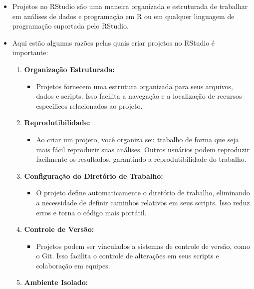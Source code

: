 \documentclass[
  letterpaper,
  DIV=11,
  numbers=noendperiod]{scrartcl}
\providecommand{\tightlist}{%
  \setlength{\itemsep}{0pt}\setlength{\parskip}{0pt}}\usepackage{longtable,booktabs,array}
\begin{document}
\begin{itemize}
\item
  Projetos no RStudio são uma maneira organizada e estruturada de
  trabalhar em análises de dados e programação em R ou em qualquer
  linguagem de programação suportada pelo RStudio.
\item
  Aqui estão algumas razões pelas quais criar projetos no RStudio é
  importante:

  \begin{enumerate}
  \def\labelenumi{\arabic{enumi}.}
  \item
    \textbf{Organização Estruturada:}

    \begin{itemize}
    \tightlist
    \item
      Projetos fornecem uma estrutura organizada para seus arquivos,
      dados e scripts. Isso facilita a navegação e a localização de
      recursos específicos relacionados ao projeto.
    \end{itemize}
  \item
    \textbf{Reprodutibilidade:}

    \begin{itemize}
    \tightlist
    \item
      Ao criar um projeto, você organiza seu trabalho de forma que seja
      mais fácil reproduzir suas análises. Outros usuários podem
      reproduzir facilmente os resultados, garantindo a
      reprodutibilidade do trabalho.
    \end{itemize}
  \item
    \textbf{Configuração do Diretório de Trabalho:}

    \begin{itemize}
    \tightlist
    \item
      O projeto define automaticamente o diretório de trabalho,
      eliminando a necessidade de definir caminhos relativos em seus
      scripts. Isso reduz erros e torna o código mais portátil.
    \end{itemize}
  \item
    \textbf{Controle de Versão:}

    \begin{itemize}
    \tightlist
    \item
      Projetos podem ser vinculados a sistemas de controle de versão,
      como o Git. Isso facilita o controle de alterações em seus scripts
      e colaboração em equipes.
    \end{itemize}
  \item
    \textbf{Ambiente Isolado:}


\end{enumerate}
\end{itemize}
\end{document}
